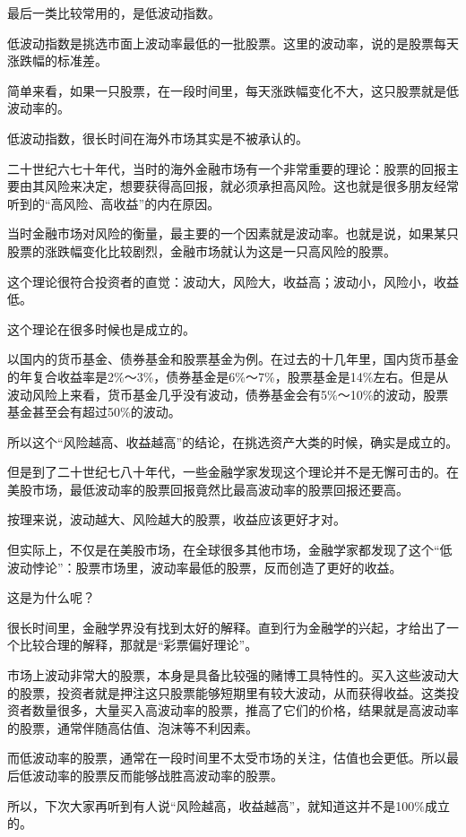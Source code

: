 最后一类比较常用的，是低波动指数。

低波动指数是挑选市面上波动率最低的一批股票。这里的波动率，说的是股票每天涨跌幅的标准差。

简单来看，如果一只股票，在一段时间里，每天涨跌幅变化不大，这只股票就是低波动率的。

低波动指数，很长时间在海外市场其实是不被承认的。

二十世纪六七十年代，当时的海外金融市场有一个非常重要的理论：股票的回报主要由其风险来决定，想要获得高回报，就必须承担高风险。这也就是很多朋友经常听到的“高风险、高收益”的内在原因。

当时金融市场对风险的衡量，最主要的一个因素就是波动率。也就是说，如果某只股票的涨跌幅变化比较剧烈，金融市场就认为这是一只高风险的股票。

这个理论很符合投资者的直觉：波动大，风险大，收益高；波动小，风险小，收益低。

这个理论在很多时候也是成立的。

以国内的货币基金、债券基金和股票基金为例。在过去的十几年里，国内货币基金的年复合收益率是2\%～3\%，债券基金是6\%～7\%，股票基金是14\%左右。但是从波动风险上来看，货币基金几乎没有波动，债券基金会有5\%～10\%的波动，股票基金甚至会有超过50\%的波动。

所以这个“风险越高、收益越高”的结论，在挑选资产大类的时候，确实是成立的。

但是到了二十世纪七八十年代，一些金融学家发现这个理论并不是无懈可击的。在美股市场，最低波动率的股票回报竟然比最高波动率的股票回报还要高。

按理来说，波动越大、风险越大的股票，收益应该更好才对。

但实际上，不仅是在美股市场，在全球很多其他市场，金融学家都发现了这个“低波动悖论”：股票市场里，波动率最低的股票，反而创造了更好的收益。

这是为什么呢？

很长时间里，金融学界没有找到太好的解释。直到行为金融学的兴起，才给出了一个比较合理的解释，那就是“彩票偏好理论”。

市场上波动非常大的股票，本身是具备比较强的赌博工具特性的。买入这些波动大的股票，投资者就是押注这只股票能够短期里有较大波动，从而获得收益。这类投资者数量很多，大量买入高波动率的股票，推高了它们的价格，结果就是高波动率的股票，通常伴随高估值、泡沫等不利因素。

而低波动率的股票，通常在一段时间里不太受市场的关注，估值也会更低。所以最后低波动率的股票反而能够战胜高波动率的股票。

所以，下次大家再听到有人说“风险越高，收益越高”，就知道这并不是100\%成立的。

